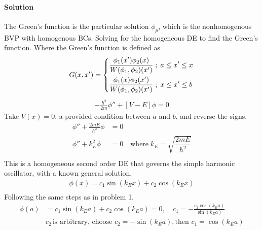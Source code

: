 \documentclass{article}
\begin{document}
{\begin{enumerate}
		\paragraph{Solution} The Green's function is the particular solution $\phi_p$, which is the nonhomogenous BVP with homogenous BCs. Solving for the homogeneous DE to find the Green's function. Where the Green's function is defined as
		\begin{equation*}
			\begin{split}
				G(x,x') =
				\begin{dcases}
					\frac{\phi_1 (x') \phi_2 (x)}{W(\phi_1 , \phi_2)(x')} \; ; \; a \leq x' \leq x \\
					\frac{\phi_1 (x) \phi_2 (x')}{W(\phi_1 , \phi_2)(x')} \; ; \; x \leq x' \leq b
				\end{dcases}
			\end{split}
		\end{equation*}
		\begin{equation*}
			\begin{split}
				-\frac{\hbar^2}{2m} \phi'' + \left[ V - E \right]\phi = 0
			\end{split}
		\end{equation*}
		Take $V(x) = 0$, a provided condition between $a$ and $b$, and reverse the signs.
		\begin{equation*}
			\begin{split}
				\phi'' + \frac{2mE}{\hbar^2}\phi &= 0 \\
				\phi'' + k^2_E\phi &= 0 \quad \text{where} \; k_E = \sqrt{\dfrac{2mE}{\hbar^2}} \\
			\end{split}
		\end{equation*}
		This is a homogeneous second order DE that governs the simple harmonic oscillator, with a known general solution.
		\begin{equation*}
			\begin{split}
				\phi(x) = c_1 \sin (k_E x) + c_2 \cos (k_E x) \\
			\end{split}
		\end{equation*}
		Following the same steps as in problem 1.
		\begin{equation*}
			\begin{split}
				\phi(a) &= c_1 \sin (k_E a) + c_2 \cos (k_E a) = 0, \quad c_1 = -\frac{c_2 \cos (k_E a)}{\sin (k_E a)} \\
				&c_2 \, \text{is arbitrary, choose } c_2 = -\sin (k_E a), \text{then } c_1 = \cos (k_E a) \\

\end{split}
\end{equation*}
\end{enumerate}}
\end{document}
